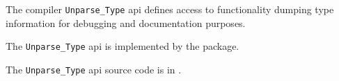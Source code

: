 
The compiler {\tt Unparse\_Type} api defines access to functionality dumping type information 
for debugging and documentation purposes.

The {\tt Unparse\_Type} api is implemented by the  package.

The {\tt Unparse\_Type} api source code is in .


